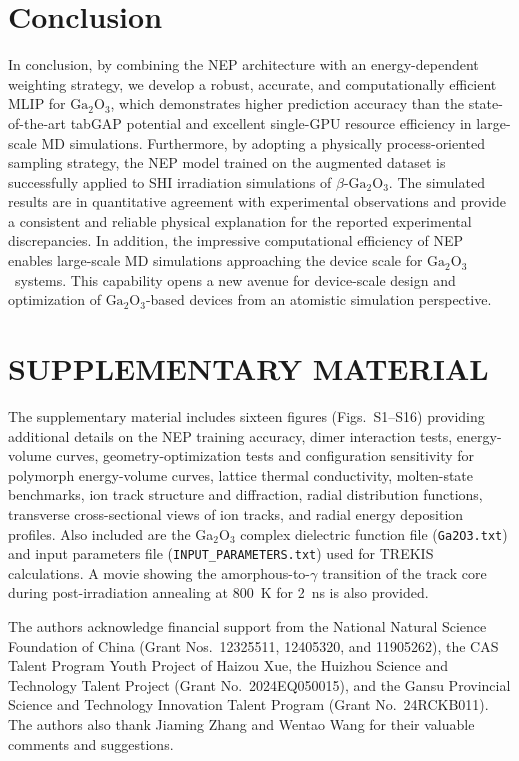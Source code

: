 \documentclass[aip,graphicx,amsmath,amssymb]{revtex4-1}
\newcommand{\ga}{$\text{Ga}_2\text{O}_3$}
\begin{document}
\section{Conclusion}

In conclusion, by combining the NEP architecture with an energy-dependent weighting
strategy, we develop a robust, accurate, and computationally efficient MLIP for \ga,
which demonstrates higher prediction accuracy than the state-of-the-art tabGAP potential
and excellent single-GPU resource efficiency in large-scale MD simulations.
Furthermore, by adopting a physically process-oriented sampling strategy, the NEP model
trained on the augmented dataset is successfully applied to SHI irradiation simulations
of $\beta$-\ga.
The simulated results are in quantitative agreement with experimental observations and
provide a consistent and reliable physical explanation for the reported experimental
discrepancies.
In addition, the impressive computational efficiency of NEP enables large-scale MD
simulations approaching the device scale for \ga\ systems.\cite{xu_device-scale_2025} 
This capability opens a new avenue for device-scale design and optimization of
\ga-based devices from an atomistic simulation perspective.


\section*{SUPPLEMENTARY MATERIAL}
The supplementary material includes sixteen figures (Figs.~S1--S16) providing additional 
details on the NEP training accuracy, dimer interaction tests, energy-volume curves,
geometry-optimization tests and configuration sensitivity for polymorph energy-volume curves,
lattice thermal conductivity,
molten-state benchmarks, ion track structure and diffraction, radial distribution functions,
transverse cross-sectional views of ion tracks, and radial energy deposition profiles.
Also included are the Ga$_2$O$_3$ complex dielectric function file (\texttt{Ga2O3.txt}) and 
input parameters file (\texttt{INPUT\_PARAMETERS.txt}) used for TREKIS calculations. 
A movie showing the amorphous-to-$\gamma$ transition of the track core during 
post-irradiation annealing at 800~K for 2~ns is also provided.

\begin{acknowledgments}
The authors acknowledge financial support from the National Natural Science Foundation of China
(Grant Nos.~12325511, 12405320, and 11905262),
the CAS Talent Program Youth Project of Haizou Xue,
the Huizhou Science and Technology Talent Project (Grant No.~2024EQ050015),
and the Gansu Provincial Science and Technology Innovation Talent Program (Grant No.~24RCKB011).
The authors also thank Jiaming Zhang and Wentao Wang for their valuable comments and suggestions.
\end{acknowledgments}
\end{document}
